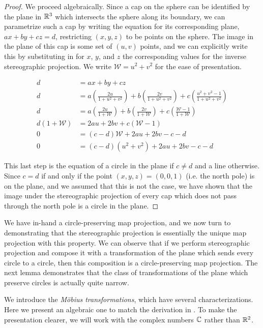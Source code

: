 \begin{proof}
  We proceed algebraically.  Since a cap on the sphere can be
  identified by the plane in $\mathbb{R}^3$ which intersects the sphere along
  its boundary, we can parametrize such a cap by writing the equation
  for its corresponding plane, $ax+by+cz=d$, restricting $(x,y,z)$ to
  be points on the sphere.  The image in the plane of this cap is some
  set of $(u,v)$ points, and we can explicitly write this by
  substituting in for $x$, $y$, and $z$ the corresponding values for
  the inverse stereographic projection.  We write
  $\mathcal{W}=u^2+v^2$ for the ease of presentation. 

  \begin{align*}
    d&=ax+by+cz\\
    d&=a\left(\frac{2u}{1+u^2+v^2}\right)+b\left(\frac{2v}{1+u^2+v^2}\right)+c\left(\frac{u^2+v^2-1}{1+u^2+v^2}\right)\\
    d&=a\left(\frac{2u}{1+\mathcal{W}}\right)+b\left(\frac{2v}{1+\mathcal{W}}\right)+c\left(\frac{\mathcal{W}-1}{1+\mathcal{W}}\right)\\
    d\left(1+\mathcal{W}\right)&=2au+2bv+c\left(\mathcal{W}-1\right)\\ 
    0 &=    (c-d)\mathcal{W} + 2au +2bv - c - d\\
    0 &= (c-d)(u^2+v^2)+2au+2bv - c - d
  \end{align*}

  This last step is the equation of a circle in the plane if $c\neq d$
  and a line otherwise.  Since $c=d$ if and only if the point
  $(x,y,z)=(0,0,1)$ (i.e. the north pole) is on the plane, and we
  assumed that this is not the case, we have shown that the image
  under the stereographic projection of every cap which does not pass
  through the north pole is a circle in the plane.

\end{proof}

We have in-hand a circle-preserving map projection, and we now
turn to demonstrating that the stereographic projection is essentially
the unique map projection with this property.  We can observe that if
we perform stereographic projection and compose it with
a transformation of the plane which sends every circle to a circle,
then this composition is a circle-preserving map projection.  The next
lemma demonstrates that the class of transformations of the plane
which preserve circles is actually quite narrow.


We introduce the \textit{M\"obius transformations}, which have several characterizations.  Here we present an algebraic one to match the derivation in .  To make the presentation clearer, we will work with the complex numbers $\mathbb{C}$ rather than $\mathbb{R}^2$.


